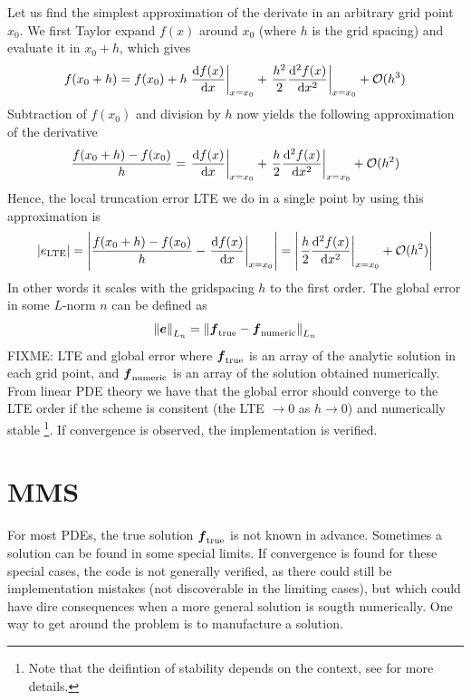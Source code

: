 Let us find the simplest approximation of the derivate in an arbitrary grid
point $x_0$. We first Taylor expand $f(x)$ around $x_0$ (where $h$ is the grid
spacing) and evaluate it in $x_0 + h$, which gives
%
\begin{align*}
    f(x_0+h)
    = f(x_0)
    + h \left.\frac{\text{d}{f(x)}}{\text{d}{x}}\right|_{x=x_0}
    + \left.\frac{h^2}{2}\frac{\text{d}{^2f(x)}}{\text{d}{x^2}}\right|_{x=x_0}
    + \mathcal{O}(h^3)
\end{align*}
%
Subtraction of $f(x_0)$ and division by $h$ now yields the following
approximation of the derivative
%
\begin{align*}
    \frac{f(x_0+h) - f(x_0)}{h}
    =  \left.\frac{\text{d}{f(x)}}{\text{d}{x}}\right|_{x=x_0}
    + \left.\frac{h}{2}\frac{\text{d}{^2f(x)}}{\text{d}{x^2}}\right|_{x=x_0}
    + \mathcal{O}(h^2)
\end{align*}
%
Hence, the local truncation error LTE we do in a single point by using this
approximation is
%
\begin{align*}
    |e_{\text{LTE}}|
    =
    \left|\frac{f(x_0+h) - f(x_0)}{h} - \left.\frac{\text{d}{f(x)}}{\text{d}{x}}\right|_{x=x_0}\right|
    =
    \left| \left.\frac{h}{2}\frac{\text{d}{^2f(x)}}{\text{d}{x^2}}\right|_{x=x_0}
    + \mathcal{O}(h^2)\right|
\end{align*}
%
In other words it scales with the gridspacing $h$ to the first order.
The global error in some $L$-norm $n$ can be defined as
%
\begin{align*}
    \left\|\boldsymbol{e}\right\|_{L_n} =
    \left\|\boldsymbol{f}_{\text{true}} - \boldsymbol{f}_{\text{numeric}}\right\|_{L_n}
\end{align*}
%
FIXME: LTE and global error
where $\boldsymbol{f}_{\text{true}}$ is an array of the analytic solution in each grid
point, and $\boldsymbol{f}_{\text{numeric}}$ is an array of the solution obtained
numerically. From linear PDE theory we have that the global error should
converge to the LTE order if the scheme is consitent (the LTE $\to 0$ as
$h\to 0$) and numerically stable%
\footnote{Note
that the deifintion of stability depends on the context, see
\cite{Leveque2007book} for more details.}.
%
If convergence is observed, the implementation is verified.

\section{MMS}
\label{sec:MMS}
For most PDEs, the true solution $\boldsymbol{f}_{\text{true}}$ is not known in
advance. Sometimes a solution can be found in some special limits.  If
convergence is found for these special cases, the code is not generally
verified, as there could still be implementation mistakes (not discoverable in
the limiting cases), but which could have dire consequences when a more general
solution is sougth numerically. One way to get around the problem is to
manufacture a solution.

